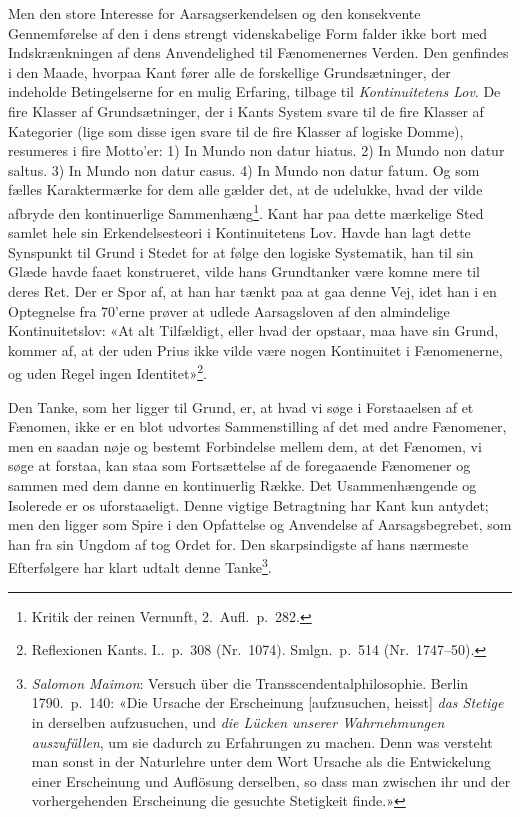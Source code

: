 \documentclass[12pt,a4paper]{article}
\newcommand{\apage}[1]{\marginnote{\footnotesize\textit{[#1]}}}
\begin{document}
Men den store Interesse for Aarsagserkendelsen og den konsekvente
Gennemførelse af den i dens strengt videnskabelige Form falder ikke bort
med Indskrænkningen af dens Anvendelighed til Fænomenernes Verden. Den
genfindes i den Maade, hvorpaa Kant fører alle de forskellige
Grundsætninger, der indeholde Betingelserne for en mulig Erfaring,
tilbage til \emph{Kontinuitetens Lov}. De fire Klasser af Grundsætninger, der i
Kants System svare til de fire Klasser af Kategorier (lige som disse igen
svare til de fire Klasser af logiske Domme), resumeres i fire Motto'er:
1) In Mundo non datur hiatus. 2) In Mundo non datur
saltus. 3) In Mundo non datur casus. 4) In Mundo non
datur fatum. Og som fælles Karaktermærke for dem alle gælder det, at de
udelukke, hvad der vilde afbryde den kontinuerlige
Sammenhæng\footnote{Kritik der reinen Vernunft, 2.\ Aufl.\ p.\
282.}. Kant har paa dette mærkelige Sted samlet hele sin Erkendelsesteori
i Kontinuitetens Lov. Havde han lagt dette Synspunkt til Grund i Stedet
for at følge den logiske Systematik, han til sin Glæde havde faaet
konstrueret, vilde hans Grundtanker være komne mere til deres Ret. Der er
Spor af, at han har tænkt paa at gaa denne Vej, idet han i en Optegnelse
fra 70'erne prøver at udlede Aarsagsloven af den almindelige
Kontinuitetslov: «At alt Tilfældigt, eller hvad der opstaar, maa have sin
Grund, kommer af, at der uden Prius ikke vilde være nogen Kontinuitet i
Fænomenerne, og uden Regel ingen Identitet»\footnote{Reflexionen
Kants. I..\ p.\ 308 (Nr.\ 1074). Smlgn.\ p.\ 514 (Nr.\ 1747--50).}.

Den Tanke, som her ligger til Grund, er, at hvad vi søge i Forstaaelsen
af et Fænomen, ikke er en blot udvortes Sammenstilling af det med andre
Fænomener, men en saadan nøje og bestemt Forbindelse mellem dem, at det
Fænomen, vi søge at forstaa, kan staa som Fortsættelse af de foregaaende
Fænomener og sammen med dem danne en kontinuerlig Række. Det
Usammenhængende og Isolerede er os uforstaaeligt. Denne vigtige
Betragtning har Kant kun antydet; men den ligger som Spire i den
Opfattelse og Anvendelse af Aarsagsbegrebet, som han fra sin Ungdom af
tog Ordet for. Den skarpsindigste af hans nærmeste Efterfølgere har klart
udtalt denne Tanke\footnote{\emph{Salomon Maimon}: Versuch über die
Transscendentalphilosophie. Berlin 1790.\ p.\ 140: «Die Ursache der
Erscheinung [aufzusuchen, heisst] \emph{das Stetige} in derselben aufzusuchen,
und \emph{die Lücken unserer Wahrnehmungen auszufüllen}, um sie dadurch zu
Erfahrungen zu machen. Denn was versteht man sonst in der Naturlehre
unter dem Wort Ursache als die Entwickelung einer Erscheinung und
Auflösung derselben, so dass man zwischen ihr und der vorhergehenden
Erscheinung die gesuchte Stetigkeit finde.»}. \apage{17} 
\end{document}
